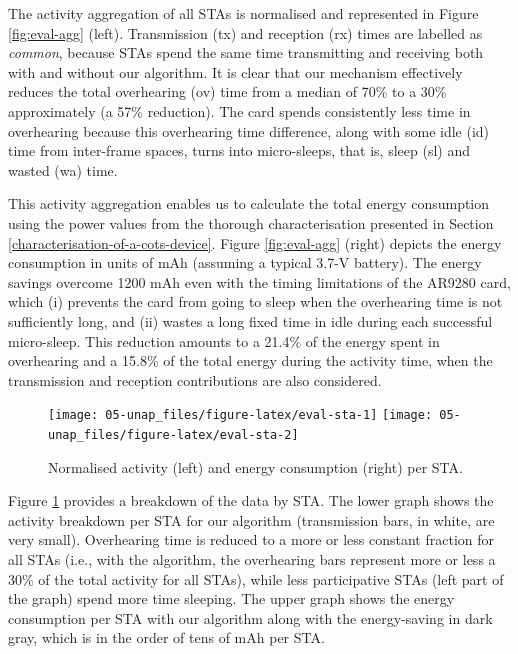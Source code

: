 \documentclass[twoside,nohyper]{tufte-book}
\theoremstyle{definition}
\theoremstyle{definition}
\theoremstyle{definition}
\theoremstyle{remark}
\begin{document}
The activity aggregation of all STAs is normalised and represented in
Figure \ref{fig:eval-agg} (left). Transmission (tx) and reception (rx)
times are labelled as \emph{common}, because STAs spend the same time
transmitting and receiving both with and without our algorithm. It is
clear that our mechanism effectively reduces the total overhearing (ov)
time from a median of 70\% to a 30\% approximately (a 57\% reduction).
The card spends consistently less time in overhearing because this
overhearing time difference, along with some idle (id) time from
inter-frame spaces, turns into micro-sleeps, that is, sleep (sl) and
wasted (wa) time.

This activity aggregation enables us to calculate the total energy
consumption using the power values from the thorough characterisation
presented in Section \ref{characterisation-of-a-cots-device}. Figure
\ref{fig:eval-agg} (right) depicts the energy consumption in units of
mAh (assuming a typical 3.7-V battery). The energy savings overcome 1200
mAh even with the timing limitations of the AR9280 card, which (i)
prevents the card from going to sleep when the overhearing time is not
sufficiently long, and (ii) wastes a long fixed time in idle during each
successful micro-sleep. This reduction amounts to a 21.4\% of the energy
spent in overhearing and a 15.8\% of the total energy during the
activity time, when the transmission and reception contributions are
also considered.




\begin{figure}

{\centering \texttt{[image: 05-unap\_files/figure-latex/eval-sta-1]} \texttt{[image: 05-unap\_files/figure-latex/eval-sta-2]} 

}

\caption[Normalised activity (left) and energy consumption (right)
per STA.]{Normalised activity (left) and energy consumption (right)
per STA.}\label{fig:eval-sta}
\end{figure}

Figure \ref{fig:eval-sta} provides a breakdown of the data by STA. The
lower graph shows the activity breakdown per STA for our algorithm
(transmission bars, in white, are very small). Overhearing time is
reduced to a more or less constant fraction for all STAs (i.e., with the
algorithm, the overhearing bars represent more or less a 30\% of the
total activity for all STAs), while less participative STAs (left part
of the graph) spend more time sleeping. The upper graph shows the energy
consumption per STA with our algorithm along with the energy-saving in
dark gray, which is in the order of tens of mAh per STA.
\end{document}
